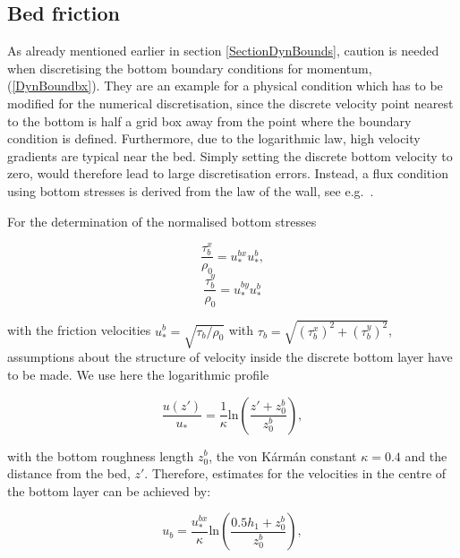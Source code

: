 
\subsection{Bed friction}\label{SectionBedFric}
 
As already mentioned earlier in section \ref{SectionDynBounds},
caution is needed when discretising the
bottom boundary conditions for momentum, (\ref{DynBoundbx}).
They are an example
for a physical condition which has to be modified for the numerical
discretisation, since the discrete velocity point nearest to the bottom
is half a grid box away from the point where the
boundary condition
is defined. Furthermore, due to the logarithmic 
law, high velocity
gradients are typical near the bed. Simply setting the discrete bottom
velocity to zero, would therefore lead to large discretisation errors.
Instead, a flux condition using bottom stresses is derived from the law of the wall,
see e.g.\ \cite{BURCHARD01b}. 

For the determination of the normalised bottom stresses

\begin{equation}\label{tauxb}
\frac{\tau^x_b}{\rho_0}=u_*^{bx}u_*^b,
\end{equation}
\begin{equation}\label{tauyb}
\frac{\tau^y_b}{\rho_0}=u_*^{by}u_*^b
\end{equation}

with the friction velocities
$u_*^b=\sqrt{\tau_b/\rho_0}$\label{pagetaub} with
$\tau_b=\sqrt{(\tau^x_{b})^2+(\tau^y_{b})^2}$,
assumptions about the structure of
velocity inside the discrete bottom layer have to be made.
We use here the logarithmic profile 

\begin{equation}\label{log_prof}
\frac{u(z')}{u_*}
=\frac{1}{\kappa}\mbox{ln}\left(\frac{z'+z_0^b}{z_0^b}\right),
\end{equation}

with the bottom roughness length $z_0^b$, the von K\'arm\'an constant $\kappa=0.4$
and the distance from the bed, $z'$. 
Therefore, estimates for the velocities in the centre of the bottom
layer can be achieved by:

\begin{equation}\label{ulogdis}
u_b = \frac{u_*^{bx}}{\kappa}\mbox{ln} \left(\frac{0.5h_1+z_0^b}{z_0^b}\right),
\end{equation}


